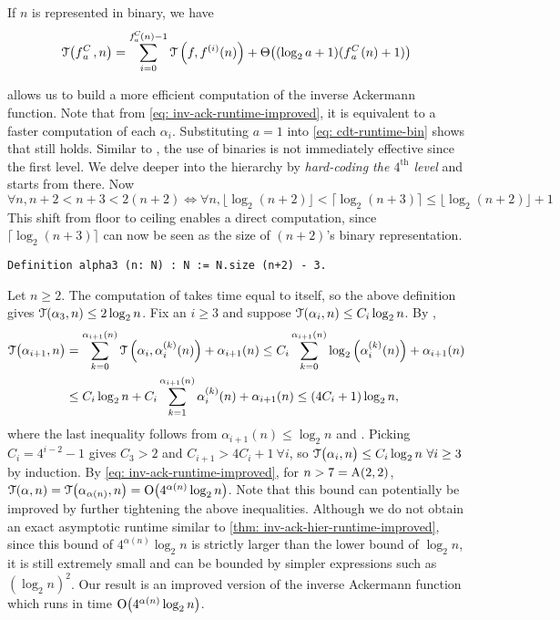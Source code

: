 {\begin{thm}
	If $n$ is represented in binary, we have
	\begin{equation} \label{eq: cdt-runtime-bin}
	\runtime\big(\cdt{f}{a}\ , n\big) = \sum_{i=0}^{\cdt{f}{a}(n) - 1}
	\runtime\left(f, f^{(i)}(n)\right) + \Theta\big((\log_2a + 1)(\cdt{f}{a}(n) + 1)\big)
	\end{equation}
\end{thm}
 allows us to build a more efficient computation of the inverse Ackermann function. Note that from \eqref{eq: inv-ack-runtime-improved}, it is equivalent to a faster computation of each $\alpha_i$. Substituting $a=1$ into \eqref{eq: cdt-runtime-bin} shows that  still holds.
Similar to , the use of binaries is not immediately effective since the first level. We delve deeper into the hierarchy by \emph{hard-coding the $4^{\text{th}}$ level} and starts from there. Now
\begin{equation*}
\forall n, n+2  < n+3 < 2(n+2) \iff \forall n,
\lfloor \log_2(n+2) \rfloor < \lceil \log_2(n+3) \rceil \le \lfloor \log_2(n+2) \rfloor + 1
\end{equation*}
This shift from floor to ceiling enables a direct computation, since $\lceil \log_2(n+3) \rceil$ can now be seen as the size of $(n+2)$'s binary representation.
\begin{lstlisting}
Definition alpha3 (n: N) : N := N.size (n+2) - 3.
\end{lstlisting}
Let $n\ge 2$. The computation of  takes time equal to itself, so the above definition gives $\mathcal{T}(\alpha_3, n) \le 2\log_2n$. Fix an $i\ge 3$ and suppose $\mathcal{T}(\alpha_i, n) \le C_i\log_2n$. By ,
\begin{equation*}
\begin{aligned}
\mathcal{T}\big(\alpha_{i+1}, n\big) & = \sum_{k=0}^{\alpha_{i+1}(n)} \mathcal{T}\left(\alpha_i, \alpha_i^{(k)}(n)\right) + \alpha_{i+1}(n)
\le C_i\sum_{k=0}^{\alpha_{i+1}(n)}\log_2 \left(\alpha_i^{(k)}(n)\right) + \alpha_{i+1}(n)\\
 & \le C_i\log_2n + C_i\sum_{k=1}^{\alpha_{i+1}(n)}\alpha_i^{(k)}(n) + \alpha_{i+1}(n)
 \le (4C_i+1)\log_2n,
\end{aligned}
\end{equation*}
where the last inequality follows from $\alpha_{i+1}(n)\le \log_2n$ and . Picking $C_i = 4^{i-2} - 1$ gives $C_3 > 2$ and $C_{i+1} > 4C_i +1 \ \forall i$, so $\mathcal{T}\big(\alpha_i, n\big) \le C_i\log_2n \ \forall i\ge 3$ by induction. By \eqref{eq: inv-ack-runtime-improved}, for $n > 7 = \text{A}(2, 2)$, $\mathcal{T}(\alpha, n) = \mathcal{T}\big(\alpha_{\alpha(n)}, n\big) = \text{O}\big(4^{\alpha(n)}\log_2n\big)$. Note that this bound can potentially be improved by further tightening the above inequalities. Although we do not obtain an exact asymptotic runtime similar to \cref{thm: inv-ack-hier-runtime-improved}, since this bound of $4^{\alpha(n)}\log_2n$ is strictly larger than the lower bound of $\log_2n$, it is still extremely small and can be bounded by simpler expressions such as $(\log_2n)^2$. Our result is an improved version of the inverse Ackermann function which runs in time $\text{O}\big(4^{\alpha(n)}\log_2n\big)$.
}
